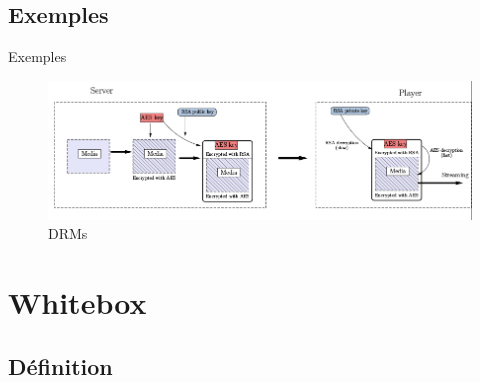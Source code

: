 \documentclass{beamer}
\begin{document}
\subsection{Exemples}

\begin{frame}{Exemples}

 \begin{figure}[h]
    \centering
    \includegraphics[scale=0.50]{./images/drms.png}
    \caption{DRMs}
    \label{fig:keygen}
  \end{figure}

\end{frame}

\section{Whitebox}

\subsection{Définition}
\end{document}
